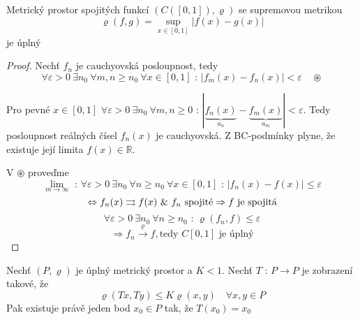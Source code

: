 \begin{vetat}
Metrický prostor spojitých funkcí $(C([0,1]), \varrho)$ se supremovou metrikou
$$\varrho(f,g) = \sup_{x \in [0,1]} |f(x) - g(x)|$$
je úplný
\end{vetat}

\begin{proof}
Nechť $f_n$ je cauchyovská posloupnost, tedy 
$$\forall \varepsilon > 0 \ \exists n_0 \ \forall m,n \geq n_0 \ \forall x \in [0,1] \textrm{ : } |f_m(x) - f_n(x)| < \varepsilon \quad \circledast$$

Pro pevné $x \in [0,1]$ $\forall \varepsilon > 0 \ \exists n_0 \ \forall m,n \geq 0 \textrm{ : } |\underbrace{f_n(x)}_{a_n} - \underbrace{f_m(x)}_{a_m}| < \varepsilon$. Tedy posloupnost reálných čísel $f_n(x)$ je cauchyovská. Z BC-podmínky plyne, že existuje její limita $f(x) \in \mathbb{R}$.

V $\circledast$ proveďme 
$$\lim_{m \to \infty} \textrm{ : } \forall \varepsilon > 0 \ \exists n_0 \ \forall n \geq n_0 \ \forall x \in [0,1] \textrm{ : } |f_n(x)-f(x)| \leq \varepsilon$$
$$\Leftrightarrow f_n(x) \rightrightarrows f(x) \textrm{ \& } f_n \textrm{ spojité} \Rightarrow f \textrm{ je spojitá}$$
$$\forall \varepsilon > 0 \ \exists n_0 \ \forall n \geq n_0 \textrm{ : } \varrho (f_n,f) \leq \varepsilon$$
$$\Rightarrow f_n \overset{\varrho}{\to} f, \textrm{tedy $C[0,1]$ je úplný}$$
\end{proof}


\begin{vetat}
\label{Banachova věta o kontrakci}
Nechť $(P, \varrho)$ je úplný metrický prostor a $K < 1$. Nechť $T \textrm{ : } P \rightarrow P$ je zobrazení takové, že 
$$\varrho(Tx, Ty) \leq K \varrho(x,y) \quad \forall x,y \in P$$
Pak existuje právě jeden bod $x_0 \in P$ tak, že $T(x_0)=x_0$
\end{vetat}

